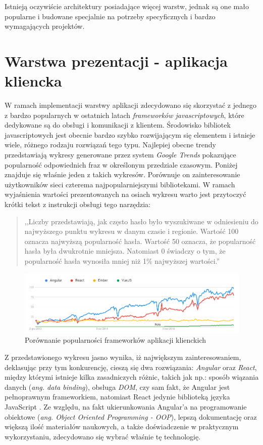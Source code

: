  
 Istnieją oczywiście architektury posiadające więcej warstw, jednak są one mało popularne i budowane specjalnie na potrzeby specyficznych i bardzo wymagających projektów.


\section{Warstwa prezentacji - aplikacja kliencka}

W ramach implementacji warstwy aplikacji zdecydowano się skorzystać z jednego z bardzo popularnych w ostatnich latach \textit{frameworków javascriptowych}, które dedykowane są do obsługi i komunikacji z klientem. Środowisko bibliotek javascriptowych jest obecnie bardzo szybko rozwijającym się elementem i istnieje wiele, różnego rodzaju rozwiązań tego typu. Najlepiej obecne trendy przedstawiają wykresy generowane przez system \textit{Google Trends} pokazujące popularność odpowiednich fraz w określonym przedziale czasowym. Poniżej znajduje się właśnie jeden z takich wykresów. Porównuje on zainteresowanie użytkowników sieci czterema najpopularniejszymi bibliotekami. W ramach wyjaśnienia wartości prezentowanych na osiach wykresu warto jest przytoczyć krótki tekst z instrukcji obsługi tego narzędzia:\\
\begin{quote}
    \item,,Liczby przedstawiają, jak często hasło było wyszukiwane w odniesieniu do najwyższego punktu wykresu w danym czasie i regionie. Wartość 100 oznacza najwyższą popularność hasła. Wartość 50 oznacza, że popularność hasła była dwukrotnie mniejsza. Natomiast 0 świadczy o tym, że popularność hasła wynosiła mniej niż 1\% najwyższej wartości.'' \cite{google-trends}
\end{quote}

\begin{figure}[ht]
	\centering
	\includegraphics[width=1\linewidth]{graphics/frontend-frameworks.png}
	\caption{Porównanie popularności frameworków aplikacji klienckich}
	\label{fig:frontend-frameworks}
\end{figure}
Z przedstawionego wykresu jasno wynika, iż największym zainteresowaniem, deklasując przy tym konkurencję, cieszą się dwa rozwiązania: \textit{Angular} oraz \textit{React}, między którymi istnieje kilka zasadniczych różnic, takich jak np.: sposób wiązania danych (\textit{ang. data binding}), obsługa \textit{DOM}, czy sam fakt, że Angular jest pełnoprawnym frameworkiem, natomiast React jedynie biblioteką języka JavaScript \cite{angular-react-comparison}. Ze względu, na fakt ukierunkowania Angular'a na programowanie obiektowe (\textit{ang. Object Oriented Programming - OOP}), lepszą dokumentację oraz większą ilość materiałów naukowych, a także doświadczenie w praktycznym wykorzystaniu, zdecydowano się wybrać właśnie tę technologię.



